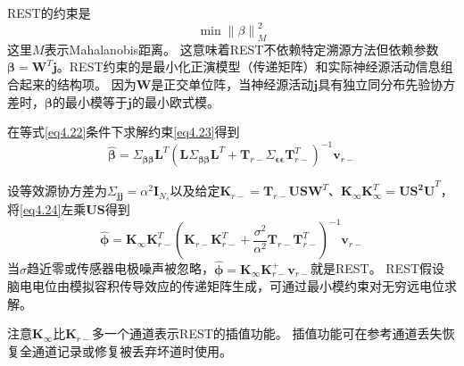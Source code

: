REST的约束是
\begin{equation}\label{eq4.23}
\min{\lVert{\beta}\rVert}_M^2
\end{equation}
这里$M$表示Mahalanobis距离。 这意味着REST不依赖特定溯源方法但依赖参数$\mathbf{\beta}=\mathbf{W}^T\mathbf{j}$。REST约束的是最小化正演模型（传递矩阵）和实际神经源活动信息组合起来的结构项。
因为$\mathbf{W}$是正交单位阵，当神经源活动$\mathbf{j}$具有独立同分布先验协方差时，$\mathbf{\beta}$的最小模等于$\mathbf{j}$的最小欧式模。

在等式\eqref{eq4.22}条件下求解约束\eqref{eq4.23}得到
\begin{equation}\label{eq4.24}
\hat{\mathbf{\beta}}=\Sigma_{\mathbf{\beta\beta}}\mathbf{L}^T(\mathbf{L}\Sigma_\mathbf{\beta\beta}\mathbf{L}^T+\mathbf{T}_{r-}\Sigma_{\mathbf{\epsilon\epsilon}}\mathbf{T}_{r-}^T)^{-1}\mathbf{v}_{r-}
\end{equation}

设等效源协方差为$\Sigma_\mathbf{jj}=\alpha^2\mathbf{I}_{N_s}$以及给定$\mathbf{K}_{r-}=\mathbf{T}_{r-}\mathbf{USW}^T$、$\mathbf{K}_{\infty}\mathbf{K}_{\infty}^T=\mathbf{US^2U}^T$，将\eqref{eq4.24}左乘$\mathbf{US}$得到
\begin{equation*}
\hat{\mathbf{\phi}}=\mathbf{K}_{\infty}\mathbf{K}_{r-}^T(\mathbf{K}_{r-}\mathbf{K}_{r-}^T+\frac{\sigma^2}{\alpha^2}\mathbf{T}_{r-}\mathbf{T}_{r-}^T)^{-1}\mathbf{v}_{r-}
\end{equation*}
当$\sigma$趋近零或传感器电极噪声被忽略，$\hat{\mathbf{\phi}}=\mathbf{K}_{\infty}\mathbf{K}_{r-}^+\mathbf{v}_{r-}$就是REST。
REST假设脑电电位由模拟容积传导效应的传递矩阵生成，可通过最小模约束对无穷远电位求解。

注意$\mathbf{K}_{\infty}$比$\mathbf{K}_{r-}$多一个通道表示REST的插值功能。 插值功能可在参考通道丢失恢复全通道记录或修复被丢弃坏道时使用。

